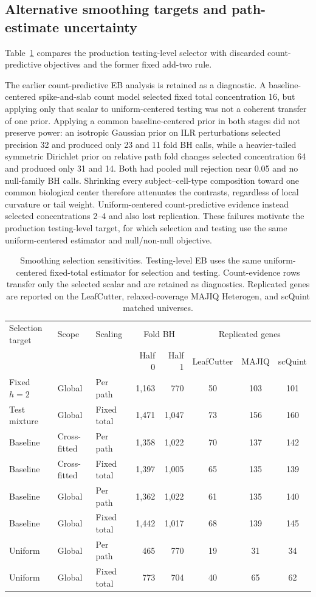 \documentclass[11pt]{article}
\begin{document}
\subsection*{Alternative smoothing targets and path-estimate uncertainty}

Table~\ref{tab:path-eb-scaling} compares the production testing-level selector with discarded count-predictive objectives and the former fixed add-two rule.

The earlier count-predictive EB analysis is retained as a diagnostic. A baseline-centered spike-and-slab count model selected fixed total concentration 16, but applying only that scalar to uniform-centered testing was not a coherent transfer of one prior. Applying a common baseline-centered prior in both stages did not preserve power: an isotropic Gaussian prior on ILR perturbations selected precision 32 and produced only 23 and 11 fold BH calls, while a heavier-tailed symmetric Dirichlet prior on relative path fold changes selected concentration 64 and produced only 31 and 14. Both had pooled null rejection near 0.05 and no null-family BH calls. Shrinking every subject--cell-type composition toward one common biological center therefore attenuates the contrasts, regardless of local curvature or tail weight. Uniform-centered count-predictive evidence instead selected concentrations 2--4 and also lost replication. These failures motivate the production testing-level target, for which selection and testing use the same uniform-centered estimator and null/non-null objective.

\begin{table}[htbp]
\centering
\small
\caption{Smoothing selection sensitivities. Testing-level EB uses the same uniform-centered fixed-total estimator for selection and testing. Count-evidence rows transfer only the selected scalar and are retained as diagnostics. Replicated genes are reported on the LeafCutter, relaxed-coverage MAJIQ Heterogen, and scQuint matched universes.}
\label{tab:path-eb-scaling}
\begin{tabular}{lllrrccc}
\toprule
Selection target & Scope & Scaling & \multicolumn{2}{c}{Fold BH} & \multicolumn{3}{c}{Replicated genes}\\
 & & & Half 0 & Half 1 & LeafCutter & MAJIQ & scQuint\\
\midrule
Fixed \(h=2\) & Global & Per path & 1,163 & 770 & 50 & 103 & 101\\
Test mixture & Global & Fixed total & 1,471 & 1,047 & 73 & 156 & 160\\
Baseline & Cross-fitted & Per path & 1,358 & 1,022 & 70 & 137 & 142\\
Baseline & Cross-fitted & Fixed total & 1,397 & 1,005 & 65 & 135 & 139\\
Baseline & Global & Per path & 1,362 & 1,022 & 61 & 135 & 140\\
Baseline & Global & Fixed total & 1,442 & 1,017 & 68 & 139 & 145\\
Uniform & Global & Per path & 465 & 770 & 19 & 31 & 34\\
Uniform & Global & Fixed total & 773 & 704 & 40 & 65 & 62\\
\bottomrule
\end{tabular}
\end{table}
\end{document}
